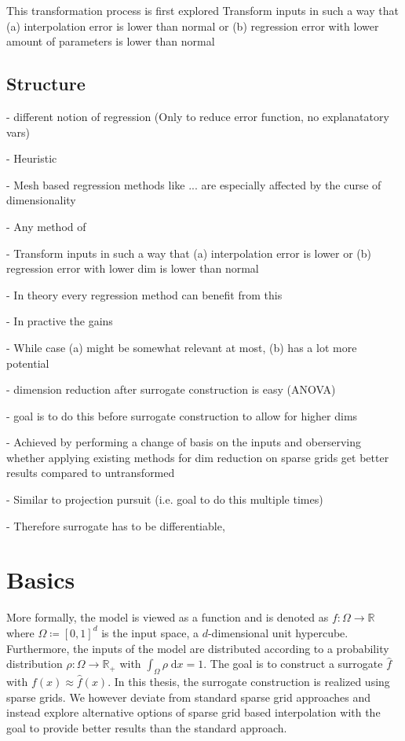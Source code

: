 \documentclass[
  a4paper,  %
  twoside,  %
  bibliography=totoc,
  headsepline,
  cleardoublepage=empty,
  parskip=half,
  draft=false
]{scrbook}
\begin{document}
This transformation process is first explored Transform inputs in such a way that (a) interpolation error is lower than normal or (b) regression error with lower amount of parameters is lower than normal
 

\section{Structure}

- different notion of regression (Only to reduce error function, no explanatatory vars)

- Heuristic

- Mesh based regression methods like ... are especially affected by the curse of dimensionality

- Any method of 

- Transform inputs in such a way that (a) interpolation error is lower or (b) regression error with lower dim is lower than normal

- In theory every regression method can benefit from this

- In practive the gains

- While case (a) might be somewhat relevant at most, (b) has a lot more potential

- dimension reduction after surrogate construction is easy (ANOVA)

- goal is to do this before surrogate construction to allow for higher dims

- Achieved by performing a change of basis on the inputs and oberserving whether applying existing methods for dim reduction on sparse grids get better results compared to untransformed

- Similar to projection pursuit (i.e. goal to do this multiple times)

- Therefore surrogate has to be differentiable, 


\chapter{Basics}
\label{chap:k1}

More formally, the model is viewed as a function and is denoted as $f \colon \Omega \to \mathds{R}$ where $\Omega \coloneqq [0,1]^d$ is the input space,  a $d$-dimensional unit hypercube.
Furthermore, the inputs of the model are distributed according to a probability distribution $\rho \colon \Omega \to \mathds{R_+}$ with $\int_{\Omega} \rho \; \text{d}x = 1$.
The goal is to construct a surrogate $\hat{f}$ with $f(x) \approx \hat{f}(x)$.
In this thesis, the surrogate construction is realized using sparse grids.
We however deviate from standard sparse grid approaches and instead explore alternative options of sparse grid based interpolation with the goal to provide better results than the standard approach.
\end{document}
